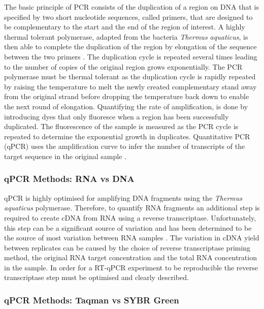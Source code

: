 \documentclass[../main.tex]{subfiles}
\begin{document}
The basic principle of PCR consists of the duplication of a region on DNA that is specified by two short nucleotide sequences, called primers, that are designed to be complementary to the start and the end of the region of interest. 
A highly thermal tolerant polymerase, adapted from the bacteria \textit{Thermus aquaticus}, is then able to complete the duplication of the region by elongation of the sequence between the two primers \parencite{Saiki1988}.
The duplication cycle is repeated several times leading to the number of copies of the original region grows exponentially.
The PCR polymerase must be thermal tolerant as the duplication cycle is rapidly repeated by raising the temperature to melt the newly created complementary stand away from the original strand before dropping the temperature back down to enable the next round of elongation. 
Quantifying the rate of amplification, is done by introducing dyes that only fluoresce when a region has been successfully duplicated. 
The fluorescence of the sample is measured as the PCR cycle is repeated to determine the exponential growth in duplicates.
Quantitative PCR (qPCR) uses the amplification curve to infer the number of transcripts of the target sequence in the original sample \parencite{Holland1991}.

\subsubsection{qPCR Methods: RNA vs DNA}

qPCR is highly optimised for amplifying DNA fragments using the \textit{Thermus aquaticus} polymerase. 
Therefore, to quantify RNA fragments an additional step is required to create cDNA from RNA using a reverse transcriptase. 
Unfortunately, this step can be a significant source of variation and has been determined to be the source of most variation between RNA samples \parencite{Stahlberg2004}. 
The variation in cDNA yield between replicates can be caused by the choice of reverse transcriptase priming method, the original RNA target concentration and the total RNA concentration in the sample. 
In order for a RT-qPCR experiment to be reproducible the reverse transcriptase step must be optimised and clearly described. 

\subsubsection{qPCR Methods: Taqman vs SYBR Green}
\end{document}

